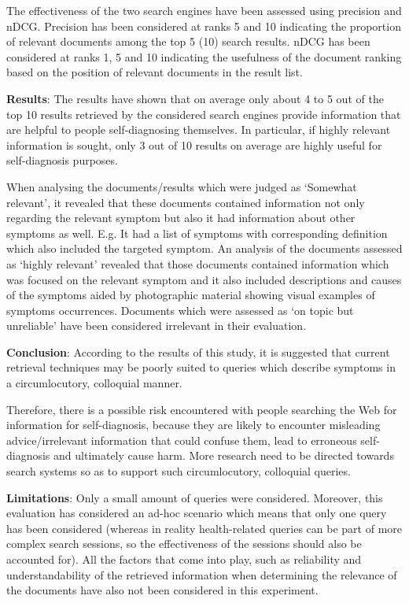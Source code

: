 \documentclass[]{article}
\begin{document}
The effectiveness of the two search engines have been assessed using precision and nDCG. Precision has been considered at ranks 5 and 10 indicating the proportion of relevant documents among the top 5 (10) search results. nDCG has been considered at ranks 1, 5 and 10 indicating the usefulness of the document ranking based on the position of relevant documents in the result list.
     
\textbf{Results}: The results have shown that on average only about 4 to 5 out of the top 10 results retrieved by the considered search engines provide information that are helpful to people self-diagnosing themselves. In particular, if highly relevant information is sought, only 3 out of 10 results on average are highly useful for self-diagnosis purposes.

When analysing the documents/results which were judged as ‘Somewhat relevant’, it revealed that these documents contained information not only regarding the relevant symptom but also it had information about other symptoms as well. E.g. It had a list of symptoms with corresponding definition which also included the targeted symptom. An analysis of the documents assessed as ‘highly relevant’ revealed that those documents contained information which was focused on the relevant symptom and it also included descriptions and causes of the symptoms aided by photographic material showing visual examples of symptoms occurrences. Documents which were assessed as ‘on topic but unreliable’ have been considered irrelevant in their evaluation.
      
\textbf{Conclusion}: According to the results of this study, it is suggested that current retrieval techniques may be poorly suited to queries which describe symptoms in a circumlocutory, colloquial manner. 

Therefore, there is a possible risk encountered with people searching the Web for information for self-diagnosis, because they are likely to encounter misleading advice/irrelevant information that could confuse them, lead to erroneous self-diagnosis and ultimately cause harm. 
More research need to be directed towards search systems so as to support such circumlocutory, colloquial queries. 
  
\textbf{Limitations}: Only a small amount of queries were considered. Moreover, this evaluation has considered an ad-hoc scenario which means that only one query has been considered (whereas in reality health-related queries can be part of more complex search sessions, so the effectiveness of the sessions should also be accounted for). All the factors that come into play, such as reliability and understandability of the retrieved information when determining the relevance of the documents have also not been considered in this experiment. 
\end{document}
